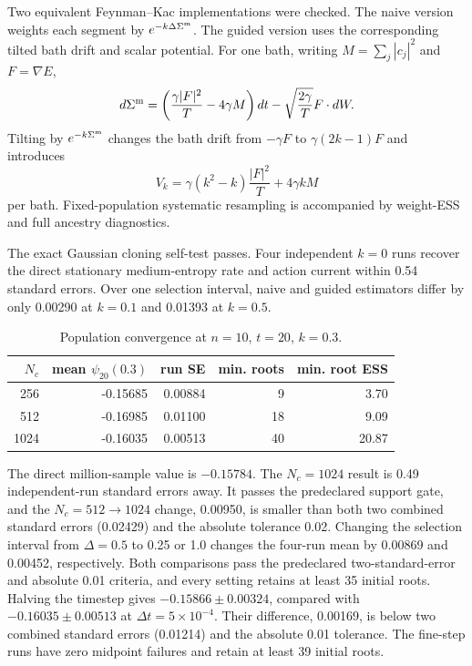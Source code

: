 \documentclass[11pt]{article}
\begin{document}
Two equivalent Feynman--Kac implementations were checked.  The naive version
weights each segment by \(e^{-k\Delta\Sigma^{\rm m}}\).  The guided version
uses the corresponding tilted bath drift and scalar potential.  For one bath,
writing \(M=\sum_j|c_j|^2\) and \(F=\nabla E\),
\[
 d\Sigma^{\rm m}
 =\left(\frac{\gamma|F|^2}{T}-4\gamma M\right)dt
 -\sqrt{\frac{2\gamma}{T}}F\cdot dW .
\]
Tilting by \(e^{-k\Sigma^{\rm m}}\) changes the bath drift from
\(-\gamma F\) to \(\gamma(2k-1)F\) and introduces
\[
 V_k=\gamma(k^2-k)\frac{|F|^2}{T}+4\gamma kM
\]
per bath.  Fixed-population systematic resampling is accompanied by
weight-ESS and full ancestry diagnostics.

The exact Gaussian cloning self-test passes.  Four independent \(k=0\) runs
recover the direct stationary medium-entropy rate and action current within
0.54 standard errors.  Over one selection interval, naive and guided
estimators differ by only 0.00290 at \(k=0.1\) and 0.01393 at \(k=0.5\).

\begin{table}[ht]
\centering
\caption{Population convergence at \(n=10\), \(t=20\), \(k=0.3\).}
\begin{tabular}{rrrrr}
\toprule
\(N_c\) & mean \(\psi_{20}(0.3)\) & run SE & min. roots & min. root ESS\\
\midrule
256  & -0.15685 & 0.00884 & 9  & 3.70\\
512  & -0.16985 & 0.01100 & 18 & 9.09\\
1024 & -0.16035 & 0.00513 & 40 & 20.87\\
\bottomrule
\end{tabular}
\end{table}

The direct million-sample value is \(-0.15784\).  The \(N_c=1024\) result is
0.49 independent-run standard errors away.  It passes the predeclared support
gate, and the \(N_c=512\to1024\) change, 0.00950, is smaller than both two
combined standard errors (0.02429) and the absolute tolerance 0.02.
Changing the selection interval from \(\Delta=0.5\) to 0.25 or 1.0 changes
the four-run mean by 0.00869 and 0.00452, respectively.  Both comparisons pass
the predeclared two-standard-error and absolute 0.01 criteria, and every
setting retains at least 35 initial roots.
Halving the timestep gives \(-0.15866\pm0.00324\), compared with
\(-0.16035\pm0.00513\) at \(\Delta t=5\times10^{-4}\).  Their difference,
0.00169, is below two combined standard errors (0.01214) and the absolute 0.01
tolerance.  The fine-step runs have zero midpoint failures and retain at least
39 initial roots.
\end{document}
